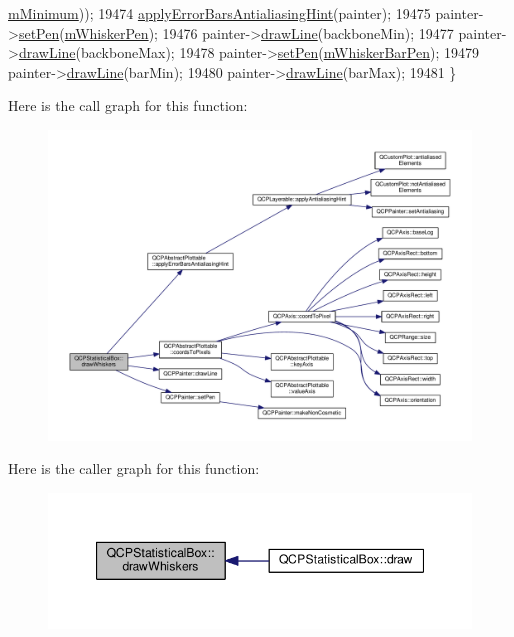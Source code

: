 \begin{DoxyCode}
      \hyperlink{class_q_c_p_statistical_box_a7143ece4e7e5f9ac010739fbc390bf0c}{mMinimum}));
19474   \hyperlink{class_q_c_p_abstract_plottable_af687bfe6160255960558eb71f1f81e73}{applyErrorBarsAntialiasingHint}(painter);
19475   painter->\hyperlink{class_q_c_p_painter_af9c7a4cd1791403901f8c5b82a150195}{setPen}(\hyperlink{class_q_c_p_statistical_box_a25b7552499f0f090fcff02858b2265a5}{mWhiskerPen});
19476   painter->\hyperlink{class_q_c_p_painter_a0b4b1b9bd495e182c731774dc800e6e0}{drawLine}(backboneMin);
19477   painter->\hyperlink{class_q_c_p_painter_a0b4b1b9bd495e182c731774dc800e6e0}{drawLine}(backboneMax);
19478   painter->\hyperlink{class_q_c_p_painter_af9c7a4cd1791403901f8c5b82a150195}{setPen}(\hyperlink{class_q_c_p_statistical_box_aa719b1d722a9f82364df1497a6dc1da8}{mWhiskerBarPen});
19479   painter->\hyperlink{class_q_c_p_painter_a0b4b1b9bd495e182c731774dc800e6e0}{drawLine}(barMin);
19480   painter->\hyperlink{class_q_c_p_painter_a0b4b1b9bd495e182c731774dc800e6e0}{drawLine}(barMax);
19481 \}
\end{DoxyCode}


Here is the call graph for this function\+:\nopagebreak
\begin{figure}[H]
\begin{center}
\leavevmode
\includegraphics[width=350pt]{class_q_c_p_statistical_box_a6f8d093ec7e404529388d02da4c72b34_cgraph}
\end{center}
\end{figure}




Here is the caller graph for this function\+:\nopagebreak
\begin{figure}[H]
\begin{center}
\leavevmode
\includegraphics[width=347pt]{class_q_c_p_statistical_box_a6f8d093ec7e404529388d02da4c72b34_icgraph}
\end{center}
\end{figure}


